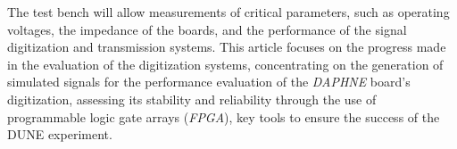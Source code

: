 

The test bench will allow measurements of critical parameters, such as operating voltages, the impedance of the boards, and the performance of the signal digitization and transmission systems. This article focuses on the progress made in the evaluation of the digitization systems, concentrating on the generation of simulated signals for the performance evaluation of the \textit{DAPHNE} board's digitization, assessing its stability and reliability through the use of programmable logic gate arrays (\textit{FPGA}), key tools to ensure the success of the DUNE experiment. %




